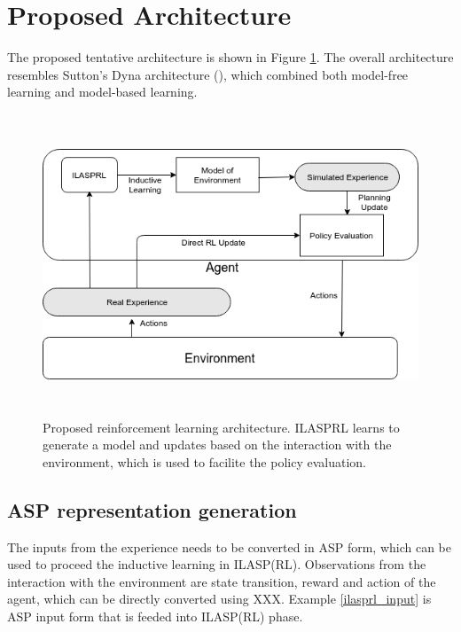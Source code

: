 \documentclass[12pt,twoside]{report}
\begin{document}
\section{Proposed Architecture}
\label{proposed_architecture_section}

The proposed tentative architecture is shown in Figure \ref{proposed_architecture}. The overall architecture resembles Sutton's Dyna architecture (\cite{Sutton1990}), which combined both model-free learning and model-based learning.

\begin{figure}[!htb]
\centering
\includegraphics[width=15cm, height=9cm]{./figures/ILASRL}
\caption{Proposed reinforcement learning architecture. ILASPRL learns to generate a model and updates based on the interaction with the environment, which is used to facilite the policy evaluation. }
\label{proposed_architecture}
\end{figure}


\subsection{ASP representation generation}

The inputs from the experience needs to be converted in ASP form, which can be used to proceed the inductive learning in ILASP(RL).
Observations from the interaction with the environment are state transition, reward and action of the agent, which can be directly converted using XXX. Example \ref{ilasprl_input} is ASP input form that is feeded into ILASP(RL) phase.
\end{document}
